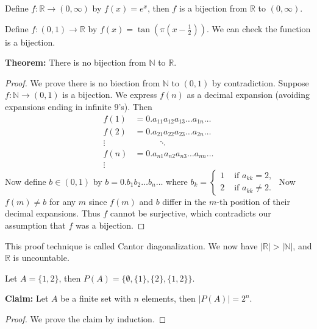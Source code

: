 \documentclass[12pt,letterpaper]{article}
\begin{document}
\begin{enumerate}
  \begin{enumerate}
  \Part Define $f: \mathbb{R} \to (0,\infty)$ by $f(x)=e^x$, then $f$ is a bijection from $\mathbb{R}$ to $(0,\infty)$.
  
  \Part Define $f: (0,1) \to \mathbb{R}$ by $f(x)=\tan \left( \pi(x-\frac{1}{2}) \right)$. We can check the function is a bijection.
  
  \end{enumerate}
  
  \Answer 
  
  {\bf Theorem:} There is no bijection from $\mathbb{N}$ to $\mathbb{R}$.
  
  \begin{proof}
  	We prove there is no biection from $\mathbb{N}$ to $(0,1)$ by contradiction. Suppose $f: \mathbb{N} \to (0,1)$ is a bijection. We express $f(n)$ as a decimal expansion (avoiding expansions ending in infinite 9's). Then
  	\begin{align*}
  		f(1)&=0.a_{11}a_{12}a_{13} \dots a_{1n} \dots\\
    	f(2)&=0.a_{21}a_{22}a_{23} \dots a_{2n} \dots\\
    	\vdots & \quad \quad\quad  \ddots\\
    	f(n)&=0.a_{n1}a_{n2}a_{n3} \dots a_{nn} \dots\\
    	\vdots &
  	\end{align*}
  Now define $b\in(0,1)$ by $b=0.b_1b_2 \dots b_n \dots $ where 
  $b_k = \begin{cases} 1 & \text{ if } a_{kk}=2,\\ 2 & \text{ if } a_{kk}\neq2.\end{cases}$ Now $f(m)\neq b$ for any $m$ since $f(m)$ and $b$ differ in the $m$-th position of their decimal expansions. Thus $f$ cannot be surjective, which contradicts our assumption that $f$ was a bijection.
  \end{proof}

This proof technique is called Cantor diagonalization. We now have $|\mathbb{R}|>|\mathbb{N}|$, and $\mathbb{R}$ is uncountable.
  
  \Answer Let $A=\{ 1,2\}$, then $P(A)=\{\emptyset, \{1\}, \{2\}, \{1,2\} \}$.
  
  \Answer 
  
  {\bf Claim:} Let $A$ be a finite set with $n$ elements, then $|P(A)|=2^n$.
  
  \begin{proof}
  We prove the claim by induction.
  

\end{proof}
\end{enumerate}
\end{document}
